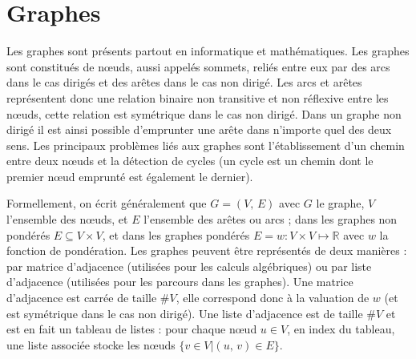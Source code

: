 \documentclass[10pt]{article}
\begin{document}
\section{Graphes}

Les graphes sont présents partout en informatique et mathématiques. Les graphes sont constitués de nœuds, aussi appelés sommets,
reliés entre eux par des arcs dans le cas dirigés et des arêtes dans le cas non dirigé.
Les arcs et arêtes représentent donc une relation binaire non transitive et non réflexive entre les nœuds,
cette relation est symétrique dans le cas non dirigé. Dans un graphe non dirigé
il est ainsi possible d'emprunter une arête dans n'importe quel des deux sens. Les principaux problèmes liés aux
graphes sont l'établissement d'un chemin entre deux nœuds et la détection de cycles (un cycle est un
chemin dont le premier nœud emprunté est également le dernier).

Formellement, on écrit généralement que $G = (V,\, E)$ avec $G$ le graphe, $V$ l'ensemble des nœuds, et
$E$ l'ensemble des arêtes ou arcs ; dans les graphes non pondérés $E \subseteq V \times V$, et dans les graphes
pondérés $E = w : V \times V \longmapsto \mathbb{R}$ avec $w$ la fonction de pondération. Les graphes peuvent être
représentés de deux manières : par matrice d'adjacence (utilisées pour les calculs algébriques) ou par liste d'adjacence
(utilisées pour les parcours dans les graphes). Une matrice d'adjacence est carrée de taille $\#V$, elle correspond donc
à la valuation de $w$ (et est symétrique dans le cas non dirigé). Une liste d'adjacence est de taille $\#V$ et est en
fait un tableau de listes : pour chaque nœud $u \in V$, en index du tableau, une liste associée stocke les nœuds
$\{v \in V | (u,\,v) \in E\}$.
\end{document}
